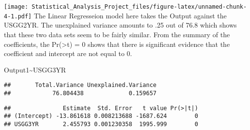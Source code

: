 \documentclass[]{article}
\newenvironment{Shaded}{\begin{snugshade}}{\end{snugshade}}
\newcommand{\KeywordTok}[1]{\textcolor[rgb]{0.13,0.29,0.53}{\textbf{#1}}}
\newcommand{\DataTypeTok}[1]{\textcolor[rgb]{0.13,0.29,0.53}{#1}}
\newcommand{\DecValTok}[1]{\textcolor[rgb]{0.00,0.00,0.81}{#1}}
\newcommand{\OperatorTok}[1]{\textcolor[rgb]{0.81,0.36,0.00}{\textbf{#1}}}
\newcommand{\NormalTok}[1]{#1}
\begin{document}
\texttt{[image: Statistical\_Analysis\_Project\_files/figure-latex/unnamed-chunk-4-1.pdf]}
The Linear Regresseion model here takes the Output against the USGG2YR.
The unexplained variance amounts to .25 out of 76.8 which shows that
these two data sets seem to be fairly similar. From the summary of the
coefficients, the Pr(\textgreater{}t) = 0 shows that there is
significant evidence that the coefficient and intercept are not equal to
0.

Output1\textasciitilde{}USGG3YR

\begin{Shaded}
\end{Shaded}

\begin{verbatim}
##       Total.Variance Unexplained.Variance 
##            76.804438             0.159657
\end{verbatim}

\begin{Shaded}
\end{Shaded}

\begin{verbatim}
##               Estimate  Std. Error   t value Pr(>|t|)
## (Intercept) -13.861618 0.008213688 -1687.624        0
## USGG3YR       2.455793 0.001230358  1995.999        0
\end{verbatim}

\begin{Shaded}
\end{Shaded}
\end{document}
